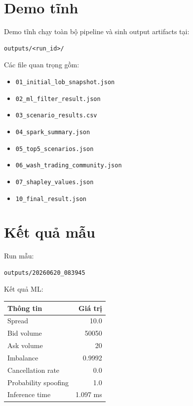 \documentclass[12pt,a4paper]{report}
\begin{document}
\section{Demo tĩnh}

Demo tĩnh chạy toàn bộ pipeline và sinh output artifacts tại:

\begin{lstlisting}
outputs/<run_id>/
\end{lstlisting}

Các file quan trọng gồm:

\begin{itemize}
    \item \texttt{01\_initial\_lob\_snapshot.json}
    \item \texttt{02\_ml\_filter\_result.json}
    \item \texttt{03\_scenario\_results.csv}
    \item \texttt{04\_spark\_summary.json}
    \item \texttt{05\_top5\_scenarios.json}
    \item \texttt{06\_wash\_trading\_community.json}
    \item \texttt{07\_shapley\_values.json}
    \item \texttt{10\_final\_result.json}
\end{itemize}

\section{Kết quả mẫu}

Run mẫu:

\begin{lstlisting}
outputs/20260620_083945
\end{lstlisting}

Kết quả ML:

\begin{longtable}{lr}
\toprule
\textbf{Thông tin} & \textbf{Giá trị} \\
\midrule
Spread & 10.0 \\
Bid volume & 50050 \\
Ask volume & 20 \\
Imbalance & 0.9992 \\
Cancellation rate & 0.0 \\
Probability spoofing & 1.0 \\
Inference time & 1.097 ms \\
\bottomrule
\end{longtable}
\end{document}
